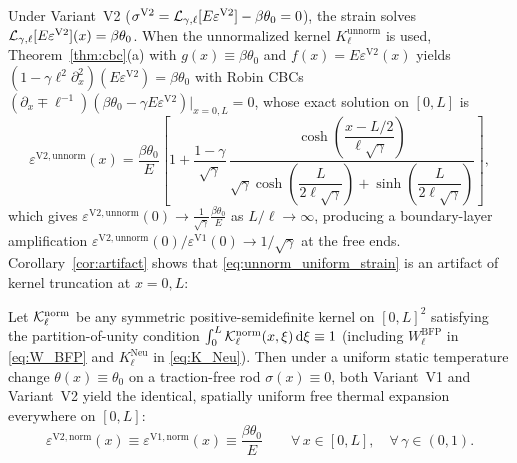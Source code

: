 Under Variant~V2 ($\sigma^{\mathrm{V2}} = \mathcal{L}_{\gamma,\ell}[E\varepsilon^{\mathrm{V2}}] - \beta\theta_0 = 0$), the strain solves $\mathcal{L}_{\gamma,\ell}[E\varepsilon^{\mathrm{V2}}](x) = \beta\theta_0$. When the unnormalized kernel $K_\ell^{\mathrm{unnorm}}$ is used, Theorem~\ref{thm:cbc}(a) with $g(x) \equiv \beta\theta_0$ and $f(x) = E\varepsilon^{\mathrm{V2}}(x)$ yields $(1-\gamma\ell^2\partial_x^2)(E\varepsilon^{\mathrm{V2}}) = \beta\theta_0$ with Robin CBCs $(\partial_x \mp \ell^{-1})(\beta\theta_0 - \gamma E\varepsilon^{\mathrm{V2}})\big|_{x=0,L} = 0$, whose exact solution on $[0,L]$ is
\begin{equation}\label{eq:unnorm_uniform_strain}
  \varepsilon^{\mathrm{V2,unnorm}}(x) = \frac{\beta\theta_0}{E}\left[1 + \frac{1-\gamma}{\sqrt{\gamma}}\,\frac{\cosh\!\left(\dfrac{x - L/2}{\ell\sqrt{\gamma}}\right)}{\sqrt{\gamma}\cosh\!\left(\dfrac{L}{2\ell\sqrt{\gamma}}\right) + \sinh\!\left(\dfrac{L}{2\ell\sqrt{\gamma}}\right)}\right],
\end{equation}
which gives $\varepsilon^{\mathrm{V2,unnorm}}(0) \to \frac{1}{\sqrt{\gamma}}\frac{\beta\theta_0}{E}$ as $L/\ell \to \infty$, producing a boundary-layer amplification $\varepsilon^{\mathrm{V2,unnorm}}(0)/\varepsilon^{\mathrm{V1}}(0) \to 1/\sqrt{\gamma}$ at the free ends. Corollary~\ref{cor:artifact} shows that \eqref{eq:unnorm_uniform_strain} is an artifact of kernel truncation at $x=0,L$:

\begin{corollary}\label{cor:artifact}
Let $\mathcal{K}_\ell^{\mathrm{norm}}$ be any symmetric positive-semidefinite kernel on $[0,L]^2$ satisfying the partition-of-unity condition $\int_0^L \mathcal{K}_\ell^{\mathrm{norm}}(x,\xi)\,\mathrm{d}\xi \equiv 1$ (including $W_\ell^{\mathrm{BFP}}$ in \eqref{eq:W_BFP} and $K_\ell^{\mathrm{Neu}}$ in \eqref{eq:K_Neu}). Then under a uniform static temperature change $\theta(x) \equiv \theta_0$ on a traction-free rod $\sigma(x) \equiv 0$, both Variant~V1 and Variant~V2 yield the identical, spatially uniform free thermal expansion everywhere on $[0,L]$:
\begin{equation}\label{eq:normalized_uniform_strain}
  \varepsilon^{\mathrm{V2,norm}}(x) \equiv \varepsilon^{\mathrm{V1,norm}}(x) \equiv \frac{\beta\theta_0}{E} \qquad \forall\, x \in [0,L], \quad \forall\, \gamma \in (0,1).
\end{equation}
\end{corollary}

